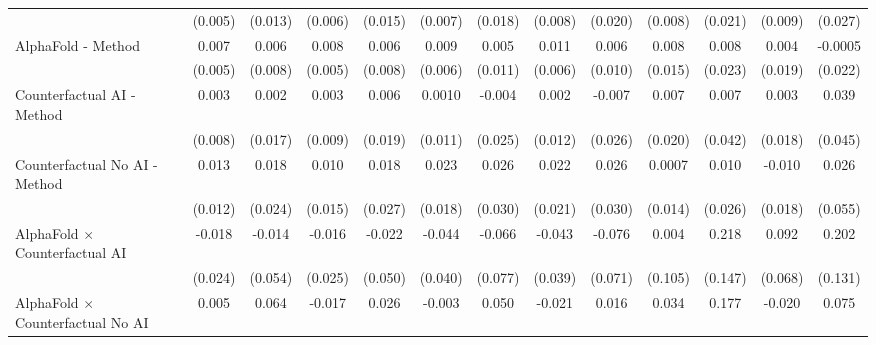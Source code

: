 \begin{tabular}{lcccccccccccc}
                                                              & (0.005)       & (0.013)       & (0.006)       & (0.015)       & (0.007)       & (0.018)       & (0.008)       & (0.020)       & (0.008) & (0.021) & (0.009)     & (0.027)\\   
   AlphaFold - Method                                         & 0.007         & 0.006         & 0.008         & 0.006         & 0.009         & 0.005         & 0.011         & 0.006         & 0.008   & 0.008   & 0.004       & -0.0005\\   
                                                              & (0.005)       & (0.008)       & (0.005)       & (0.008)       & (0.006)       & (0.011)       & (0.006)       & (0.010)       & (0.015) & (0.023) & (0.019)     & (0.022)\\   
   Counterfactual AI - Method                                 & 0.003         & 0.002         & 0.003         & 0.006         & 0.0010        & -0.004        & 0.002         & -0.007        & 0.007   & 0.007   & 0.003       & 0.039\\   
                                                              & (0.008)       & (0.017)       & (0.009)       & (0.019)       & (0.011)       & (0.025)       & (0.012)       & (0.026)       & (0.020) & (0.042) & (0.018)     & (0.045)\\   
   Counterfactual No AI - Method                              & 0.013         & 0.018         & 0.010         & 0.018         & 0.023         & 0.026         & 0.022         & 0.026         & 0.0007  & 0.010   & -0.010      & 0.026\\   
                                                              & (0.012)       & (0.024)       & (0.015)       & (0.027)       & (0.018)       & (0.030)       & (0.021)       & (0.030)       & (0.014) & (0.026) & (0.018)     & (0.055)\\   
   AlphaFold $\times$ Counterfactual AI                       & -0.018        & -0.014        & -0.016        & -0.022        & -0.044        & -0.066        & -0.043        & -0.076        & 0.004   & 0.218   & 0.092       & 0.202\\   
                                                              & (0.024)       & (0.054)       & (0.025)       & (0.050)       & (0.040)       & (0.077)       & (0.039)       & (0.071)       & (0.105) & (0.147) & (0.068)     & (0.131)\\   
   AlphaFold $\times$ Counterfactual No AI                    & 0.005         & 0.064         & -0.017        & 0.026         & -0.003        & 0.050         & -0.021        & 0.016         & 0.034   & 0.177   & -0.020      & 0.075\\   

\end{tabular}
